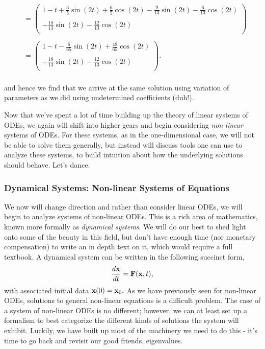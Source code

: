 \begin{itemize}
\begin{align*}
&= \left(  \begin{array}{c}  1-t + \frac{3}{5}\sin(2t) + \frac{6}{5}\cos(2t) - \frac{9}{13}\sin(2t) - \frac{6}{13} \cos(2t) \\  \\ -\frac{18}{13} \sin(2t) - \frac{12}{13} \cos(2t)  \\  \end{array} \right)\\ \\
&= \left( \begin{array}{c}   1 -t - \frac{6}{65}\sin(2t) + \frac{48}{65} \cos(2t)  \\  \\  -\frac{18}{13} \sin(2t) - \frac{12}{13} \cos(2t)  \\   \end{array} \right). \\
\end{align*}

and hence we find that we arrive at the same solution using variation of parameters as we did using undetermined coefficients (duh!). 

\end{itemize}

Now that we've spent a lot of time building up the theory of linear systems of ODEs, we again will shift into higher gears and begin considering \emph{non-linear} systems of ODEs. For these systems, as in the one-dimensional case, we will not be able to solve them generally, but instead will discuss tools one can use to analyze these systems, to build intuition about how the underlying solutions should behave. Let's dance.\\




%
%
%
%
\subsubsection{Dynamical Systems: Non-linear Systems of Equations}

We now will change direction and rather than consider linear ODEs, we will begin to analyze systems of non-linear ODEs. This is a rich area of mathematics, known more formally as \emph{dynamical systems}. We will do our best to shed light onto some of the beauty in this field, but don't have enough time (nor monetary compensation) to write an in depth text on it, which would require a full textbook. A dynamical system can be written in the following succinct form, 
$$\frac{d{\bf{x}}}{dt} = {\bf{F}}({\bf{x}},t),$$ 
%
with associated initial data ${\bf{x}}(0) = {\bf{x}}_0.$ As we have previously seen for non-linear ODEs, solutions to general non-linear equations is a difficult problem. The case of a system of non-linear ODEs is no different; however, we can at least set up a formalism to best categorize the different kinds of solutions the system will exhibit. Luckily, we have built up most of the machinery we need to do this - it's time to go back and revisit our good friends, eigenvalues. \\

